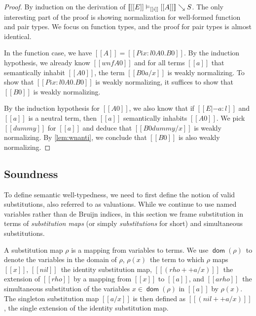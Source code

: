 \documentclass[acmsmall, screen=true, nonacm=true,
  review=\ifpublic false\else true\fi,
  anonymous=\ifanonymous true\else false\fi
]{acmart}
\DeclarePairedDelimiter{\bracks}{\llbracket}{\rrbracket}
\newcommand{\interp}[4]{\bracks{#1 \vDash_{#2} #3} \searrow #4}
\newcommand{\dom}{\mathop{\mathsf{dom}}}
\begin{document}
\begin{proof}
  By induction on the derivation of
  $\interp{[[E]]}{[[i]]}{[[A]]}{S}$.
  The only interesting part of the proof is showing normalization for
  well-formed function and pair
  types. We focus on function types, and the proof for pair types is
  almost identical.

  In the function case, we have $[[A]] = [[Pi x : l0 A0 . B0]]$. By
  the induction hypothesis, we already know $[[wnf A0]]$ and for all
  terms $[[a]]$ that semantically inhabit $[[A0]]$, the term $[[B0 {a
    / x}]]$ is weakly normalizing. To show that $[[Pi x : l0 A0. B0]]$
  is weakly normalizing, it suffices to show that $[[B0]]$ is weakly
  normalizing. 

  By the induction hypothesis for $[[A0]]$, we also know that
  if $[[E |- a : l]]$ and $[[a]]$ is a neutral term, then $[[a]]$
  semantically inhabits $[[A0]]$. We pick $[[dummy]]$
  for $[[a]]$ and deduce that $[[B0 {dummy / x}]]$ is weakly
  normalizing. By \cref{lem:wnanti}, we conclude that $[[B0]]$ is
  also weakly normalizing.
\end{proof}

\subsection{Soundness}
\label{sec:soundness}
To define semantic well-typedness, we need to first define the notion
of valid substitutions, also referred to as valuations.
While we continue to use named variables rather than de Bruijn indices,
in this section we frame substitution in terms of \emph{substitution maps}
(or simply \emph{substitutions} for short)
and simultaneous substitutions.

\begin{definition}
  A substitution map $\rho$ is a mapping from variables to terms.
  We use $\dom(\rho)$~to denote the variables in the domain of $\rho$,
  $\rho(x)$~the term to which $\rho$ maps $[[x]]$,
  $[[nil]]$~the identity substitution map,
  $[[(rho ++ { a / x })]]$~the extension of $[[rho]]$
  by a mapping from $[[x]]$ to $[[a]]$,
  and $[[a { rho }]]$~the simultaneous substitution
  of the variables $x \in \dom(\rho)$ in $[[a]]$ by $\rho(x)$.
  The singleton substitution map $[[{ a / x }]]$
  is then defined as $[[(nil ++ { a / x })]]$,
  the single extension of the identity substitution map.
\end{definition}
\end{document}

